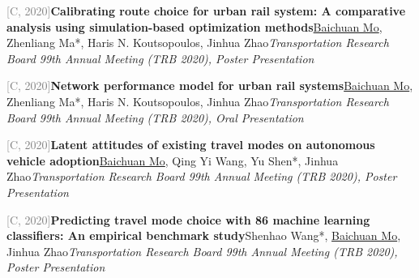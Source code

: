 \par\noindent\begin{minipage}{\linewidth}
{\textcolor{gray}{[C\themyCounterNew, 2020]\;}}{\textbf{Calibrating route choice for urban rail system: A comparative analysis using simulation-based optimization methods}}{\newline \underline{Baichuan Mo}, Zhenliang Ma*, Haris N. Koutsopoulos, Jinhua Zhao}{\newline \emph{Transportation Research Board 99th Annual Meeting (TRB 2020), Poster Presentation}}{{}}{}
\end{minipage}\par\vspace{5.5pt}


\par\noindent\begin{minipage}{\linewidth}
{\textcolor{gray}{[C\themyCounterNew, 2020]\;}}{\textbf{Network performance model for urban rail systems}}{\newline \underline{Baichuan Mo}, Zhenliang Ma*, Haris N. Koutsopoulos, Jinhua Zhao}{\newline \emph{Transportation Research Board 99th Annual Meeting (TRB 2020), Oral Presentation}}{{}}{}
\end{minipage}\par\vspace{5.5pt}


\par\noindent\begin{minipage}{\linewidth}
{\textcolor{gray}{[C\themyCounterNew, 2020]\;}}{\textbf{Latent attitudes of existing travel modes on autonomous vehicle adoption}}{\newline \underline{Baichuan Mo}, Qing Yi Wang, Yu Shen*, Jinhua Zhao}{\newline \emph{Transportation Research Board 99th Annual Meeting (TRB 2020), Poster Presentation}}{{}}{}
\end{minipage}\par\vspace{5.5pt}


\par\noindent\begin{minipage}{\linewidth}
{\textcolor{gray}{[C\themyCounterNew, 2020]\;}}{\textbf{Predicting travel mode choice with 86 machine learning classifiers: An empirical benchmark study}}{\newline Shenhao Wang*, \underline{Baichuan Mo}, Jinhua Zhao}{\newline \emph{Transportation Research Board 99th Annual Meeting (TRB 2020), Poster Presentation}}{{}}{}
\end{minipage}\par\vspace{5.5pt}


